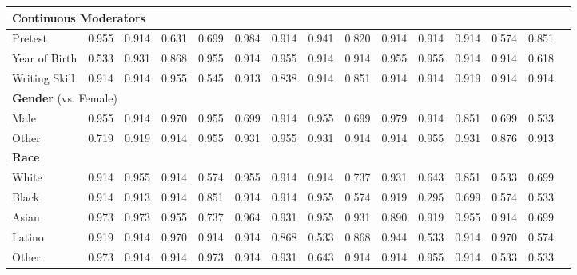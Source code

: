 \documentclass[11pt]{report}
\begin{document}
\begin{append}
\begin{landscape}
\begin{table}[h]
\begin{tabular}{@{\extracolsep{-4pt}}lcccccccccccccc}
    \multicolumn{14}{l}{\textbf{Continuous Moderators}} \\ 
    \midrule
    Pretest         & 0.955 & 0.914 & 0.631 & 0.699 & 0.984 & 0.914 & 0.941 & 0.820 & 0.914 & 0.914 & 0.914 & 0.574 & 0.851 \\ 
    Year of Birth   & 0.533 & 0.931 & 0.868 & 0.955 & 0.914 & 0.955 & 0.914 & 0.914 & 0.955 & 0.955 & 0.914 & 0.914 & 0.618 \\ 
    Writing Skill   & 0.914 & 0.914 & 0.955 & 0.545 & 0.913 & 0.838 & 0.914 & 0.851 & 0.914 & 0.914 & 0.919 & 0.914 & 0.914 \\ 
    \midrule
    
    \multicolumn{14}{l}{\textbf{Gender} (vs. Female)} \\ 
    \midrule
    Male            & 0.955 & 0.914 & 0.970 & 0.955 & 0.699 & 0.914 & 0.955 & 0.699 & 0.979 & 0.914 & 0.851 & 0.699 & 0.533 \\ 
    Other           & 0.719 & 0.919 & 0.914 & 0.955 & 0.931 & 0.955 & 0.931 & 0.914 & 0.914 & 0.955 & 0.931 & 0.876 & 0.913 \\ 
    \midrule
    
    \multicolumn{14}{l}{\textbf{Race}} \\ 
    \midrule
    White           & 0.914 & 0.955 & 0.914 & 0.574 & 0.955 & 0.914 & 0.914 & 0.737 & 0.931 & 0.643 & 0.851 & 0.533 & 0.699 \\ 
    Black           & 0.914 & 0.913 & 0.914 & 0.851 & 0.914 & 0.914 & 0.955 & 0.574 & 0.919 & 0.295 & 0.699 & 0.574 & 0.533 \\ 
    Asian           & 0.973 & 0.973 & 0.955 & 0.737 & 0.964 & 0.931 & 0.955 & 0.931 & 0.890 & 0.919 & 0.955 & 0.914 & 0.699 \\ 
    Latino          & 0.919 & 0.914 & 0.970 & 0.914 & 0.914 & 0.868 & 0.533 & 0.868 & 0.944 & 0.533 & 0.914 & 0.970 & 0.574 \\ 
    Other           & 0.973 & 0.914 & 0.914 & 0.973 & 0.914 & 0.931 & 0.643 & 0.914 & 0.914 & 0.955 & 0.914 & 0.533 & 0.533 \\ 
    \midrule
    

\end{tabular}
\end{table}
\end{landscape}
\end{append}
\end{document}
